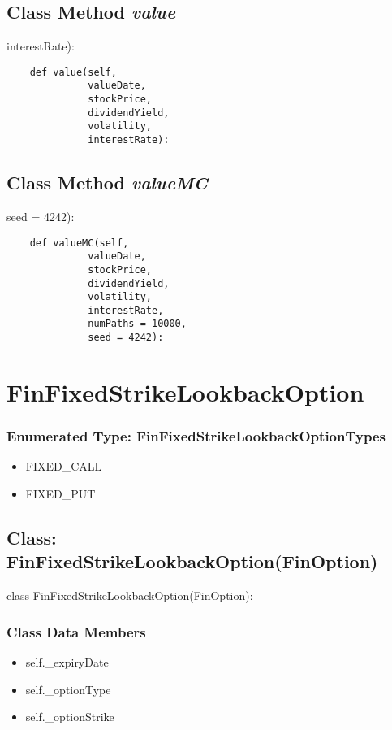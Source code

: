 \documentclass[twoside,11pt]{book}
\begin{document}
\subsection{Class Method {\it value}}
interestRate):

\begin{lstlisting}
    def value(self,
              valueDate,
              stockPrice,
              dividendYield,
              volatility,
              interestRate):
\end{lstlisting}

\subsection{Class Method {\it valueMC}}
seed = 4242):

\begin{lstlisting}
    def valueMC(self,
              valueDate,
              stockPrice,
              dividendYield,
              volatility,
              interestRate,
              numPaths = 10000,
              seed = 4242):
\end{lstlisting}

\newpage
\section{FinFixedStrikeLookbackOption}

\subsubsection{Enumerated Type: FinFixedStrikeLookbackOptionTypes}
\begin{itemize}
\item{FIXED\_CALL}
\item{FIXED\_PUT}
\end{itemize}

\subsection{Class: FinFixedStrikeLookbackOption(FinOption)}
class FinFixedStrikeLookbackOption(FinOption):

\subsubsection{Class Data Members}
\begin{itemize}
\item{self.\_expiryDate}
\item{self.\_optionType}
\item{self.\_optionStrike}
\end{itemize}
\end{document}
